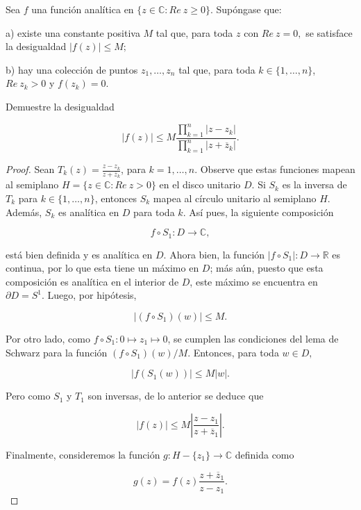 \documentclass[12pt]{article}
\newcommand{\R}{\mathbb{R}}
\newcommand{\C}{\mathbb{C}}
\newenvironment{problem}[2][Problema]{\begin{trivlist}
\item[\hskip \labelsep {\bfseries #1}\hskip \labelsep {\bfseries #2.}]}{\end{trivlist}}
\begin{document}
\begin{problem}{3, agosto 2014}
Sea $f$ una función analítica en $\{z\in \C: Re \ z \geq 0 \}$. Supóngase que:

a) existe una constante positiva $M$ tal que, para toda $z$ con $Re \ z = 0,$ se satisface la desigualdad $\lvert f(z) \rvert \leq M;$

b) hay una colección de puntos $z_1, \ldots, z_n$ tal que, para toda $k \in \{1, \ldots, n \}$, $Re \ z_k > 0$ y $f(z_k) = 0.$

Demuestre la desigualdad 

$$\lvert f(z) \rvert \leq M \frac{\prod_{k=1}^n \lvert z - z_k \rvert}{\prod_{k=1}^n \lvert z + \overline{z}_k \rvert}.$$
\end{problem}

\begin{proof}
Sean $T_k(z) = \frac{z-z_k}{z + \overline{z}_k}$, para $k=1, \ldots, n.$ Observe que estas funciones mapean al semiplano $H = \{z \in \C: Re \ z > 0 \}$ en el disco unitario $D$. Si $S_k$ es la inversa de $T_k$ para $k\in \{1, \ldots, n\}$, entonces $S_k$ mapea al círculo unitario al semiplano $H$. Además, $S_k$ es analítica en $D$ para toda $k$.  Así pues, la siguiente composición 

$$f \circ S_1: D \rightarrow  \C, $$

está bien definida y es analítica en $D.$ Ahora bien, la función $\lvert f \circ S_1 \rvert: D \rightarrow \R$ es continua, por lo que esta tiene un máximo en $D$; más aún, puesto que esta composición es analítica en el interior de $D$, este máximo se encuentra en $\partial D = S^1.$ Luego, por hipótesis,  

$$\lvert (f \circ S_1)(w) \rvert \leq M.$$

Por otro lado, como $f \circ S_1: 0 \mapsto z_1 \mapsto 0$, se cumplen las condiciones del lema de Schwarz para la función $(f \circ S_1)(w) / M$. Entonces, para toda $w \in D,$

$$\lvert f(S_1(w))  \rvert \leq M \lvert w \rvert.$$

Pero como $S_1$ y $T_1$ son inversas, de lo anterior se deduce que 

$$\lvert f(z) \rvert \leq M \left \lvert \frac{z - z_1}{z + \overline z_1} \right\rvert.$$

Finalmente, consideremos la función $ g: H-\{z_1\} \rightarrow \C $ definida como 

$$g(z) = f(z) \frac{z + \overline z_1}{z - z_1}. $$


\end{proof}
\end{document}
